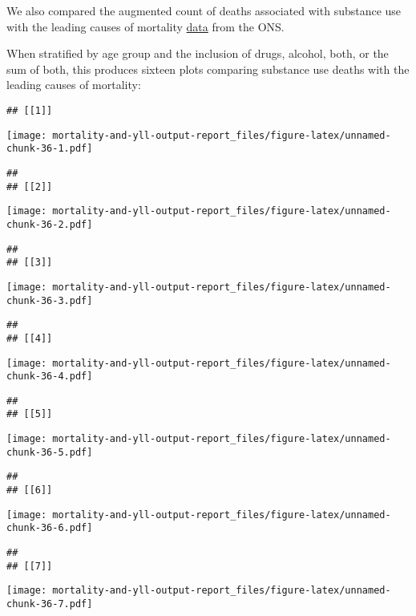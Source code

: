 \documentclass[
]{article}
\begin{document}
We also compared the augmented count of deaths associated with substance
use with the leading causes of mortality
\href{https://www.ons.gov.uk/peoplepopulationandcommunity/healthandsocialcare/causesofdeath/datasets/avoidablemortalitybylocalauthorityinenglandandwales}{data}
from the ONS.

When stratified by age group and the inclusion of drugs, alcohol, both,
or the sum of both, this produces sixteen plots comparing substance use
deaths with the leading causes of mortality:

\begin{verbatim}
## [[1]]
\end{verbatim}

\texttt{[image: mortality-and-yll-output-report\_files/figure-latex/unnamed-chunk-36-1.pdf]}

\begin{verbatim}
## 
## [[2]]
\end{verbatim}

\texttt{[image: mortality-and-yll-output-report\_files/figure-latex/unnamed-chunk-36-2.pdf]}

\begin{verbatim}
## 
## [[3]]
\end{verbatim}

\texttt{[image: mortality-and-yll-output-report\_files/figure-latex/unnamed-chunk-36-3.pdf]}

\begin{verbatim}
## 
## [[4]]
\end{verbatim}

\texttt{[image: mortality-and-yll-output-report\_files/figure-latex/unnamed-chunk-36-4.pdf]}

\begin{verbatim}
## 
## [[5]]
\end{verbatim}

\texttt{[image: mortality-and-yll-output-report\_files/figure-latex/unnamed-chunk-36-5.pdf]}

\begin{verbatim}
## 
## [[6]]
\end{verbatim}

\texttt{[image: mortality-and-yll-output-report\_files/figure-latex/unnamed-chunk-36-6.pdf]}

\begin{verbatim}
## 
## [[7]]
\end{verbatim}

\texttt{[image: mortality-and-yll-output-report\_files/figure-latex/unnamed-chunk-36-7.pdf]}
\end{document}
